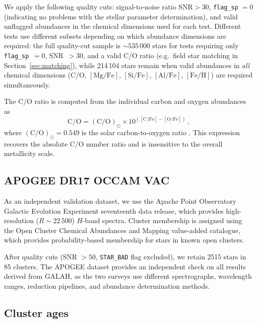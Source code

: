\documentclass[fleqn,usenatbib]{mnras}
\newcommand{\feh}{$\mathrm{[Fe/H]}$\xspace}
\newcommand{\mgfe}{$\mathrm{[Mg/Fe]}$\xspace}
\newcommand{\sife}{$\mathrm{[Si/Fe]}$\xspace}
\newcommand{\alfe}{$\mathrm{[Al/Fe]}$\xspace}
\newcommand{\co}{C/O\xspace}
\begin{document}
We apply the following quality cuts: signal-to-noise ratio $\mathrm{SNR} > 30$, \texttt{flag\_sp} $= 0$ (indicating no problems with the stellar parameter determination), and valid unflagged abundances in the chemical dimensions used for each test.
Different tests use different subsets depending on which abundance dimensions are required: the full quality-cut sample is ${\sim}535\,000$ stars for tests requiring only \texttt{flag\_sp}~$= 0$, SNR~$> 30$, and a valid \co ratio (e.g.\ field star matching in Section~\ref{sec:matching}), while 214\,104 stars remain when valid abundances in \emph{all} chemical dimensions (\co, \mgfe, \sife, \alfe, \feh) are required simultaneously.

The \co ratio is computed from the individual carbon and oxygen abundances as
\begin{equation}
\mathrm{C/O} = (\mathrm{C/O})_\odot \times 10^{(\mathrm{[C/Fe]} - \mathrm{[O/Fe]})} \,,
\label{eq:co}
\end{equation}
where $(\mathrm{C/O})_\odot = 0.549$ is the solar carbon-to-oxygen ratio \citep{Asplund2009}. This expression recovers the absolute \co number ratio and is insensitive to the overall metallicity scale.

\subsection{APOGEE DR17 OCCAM VAC}
\label{sec:apogee}

As an independent validation dataset, we use the Apache Point Observatory Galactic Evolution Experiment \citep[APOGEE;][]{Abdurrouf2022} seventeenth data release, which provides high-resolution ($R \sim 22\,500$) $H$-band spectra.
Cluster membership is assigned using the Open Cluster Chemical Abundances and Mapping \citep[OCCAM;][]{Donor2020} value-added catalogue, which provides probability-based membership for stars in known open clusters.

After quality cuts (SNR $> 50$, \texttt{STAR\_BAD} flag excluded), we retain 2515 stars in 85 clusters.
The APOGEE dataset provides an independent check on all results derived from GALAH, as the two surveys use different spectrographs, wavelength ranges, reduction pipelines, and abundance determination methods.

\subsection{Cluster ages}
\label{sec:ages}
\end{document}
